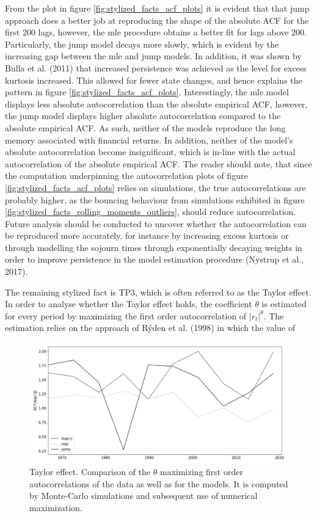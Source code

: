 From the plot in figure \ref{fig:stylized_facts_acf_plots} it is evident that that jump approach does a better job at reproducing the shape of the absolute ACF for the first 200 lags, however, the mle procedure obtains a better fit for lags above 200. Particularly, the jump model decays more slowly, which is evident by the increasing gap between the mle and jump models. In addition, it was shown by Bulla et al. (2011) that increased persistence was achieved as the level for excess kurtosis increased. This allowed for fewer state changes, and hence explains the pattern in figure \ref{fig:stylized_facts_acf_plots}. Interestingly, the mle model displays less absolute autocorrelation than the absolute empirical ACF, however, the jump model displays higher absolute autocorrelation compared to the absolute empirical ACF. As such, neither of the models reproduce the long memory associated with financial returns. In addition, neither of the model's absolute autocorrelation become insignificant, which is in-line with the actual autocorrelation of the absolute empirical ACF. The reader should note, that since the computation underpinning the autocorrelation plots of figure \ref{fig:stylized_facts_acf_plots} relies on simulations, the true autocorrelations are probably higher, as the bouncing behaviour from simulations exhibited in figure \ref{fig:stylized_facts_rolling_moments_outliers}, should reduce autocorrelation. Future analysis should be conducted to uncover whether the autocorrelation can be reproduced more accurately, for instance by increasing excess kurtosis or through modelling the sojourn times through exponentially decaying weights in order to improve persistence in the model estimation procedure (Nystrup et al., 2017).

The remaining stylized fact is TP3, which is often referred to as the Taylor effect. In order to analyse whether the Taylor effect holds, the coefficient $\theta$ is estimated for every period by maximizing the first order autocorrelation of $|r_t|^{\theta}$. The estimation relies on the approach of Rýden et al. (1998) in which the value of 



\begin{figure}[H] 
    \centering
    \includegraphics[width=1.0\textwidth]{analysis/stylized_facts/images/acf_taylor_effect.png}
    \caption{Taylor effect. Comparison of the $\theta$ maximizing first order autocorrelations of the data as well as for the models. It is computed by Monte-Carlo simulations and subsequent use of numerical maximization.}
    \label{fig:stylized_facts_taylor_effect} 
\end{figure}


